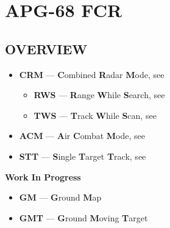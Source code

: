 \section{APG-68 FCR}

\subsection{OVERVIEW}
\begin{tcoloritemize}
    \blueitem[A-A Modes]
    \begin{itemize}
        \item \textbf{CRM} --- \textbf{C}ombined \textbf{R}adar \textbf{M}ode, \break see 
        \begin{itemize}
            \item \textbf{RWS} --- \textbf{R}ange \textbf{W}hile \textbf{S}earch, \break see 
            \item \textbf{TWS} --- \textbf{T}rack \textbf{W}hile \textbf{S}can, \break see 
        \end{itemize}
        \item \textbf{ACM} --- \textbf{A}ir \textbf{C}ombat \textbf{M}ode, see 
        \item \textbf{STT} --- \textbf{S}ingle \textbf{T}arget \textbf{T}rack, see 
    \end{itemize}
    \blueitem[A-G Modes]
    \textbf{Work In Progress}
    \begin{itemize}
        \item \textbf{GM} --- \textbf{G}round \textbf{M}ap
        \item \textbf{GMT} --- \textbf{G}round \textbf{M}oving \textbf{T}arget
    \end{itemize}
\end{tcoloritemize}

